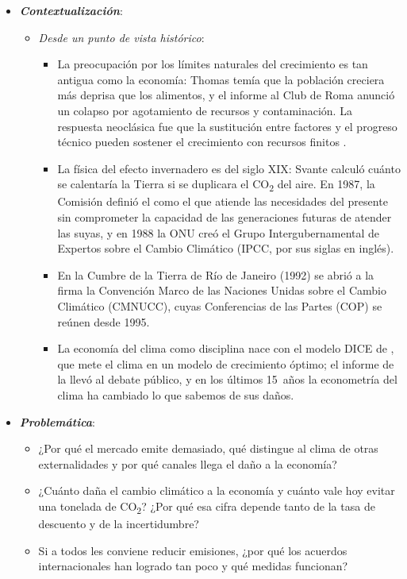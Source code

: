 \documentclass[11pt]{article}
\begin{document}
\begin{itemize}
\item \textbf{\emph{Contextualización}}:
  \begin{itemize}
  \item \emph{Desde un punto de vista histórico}:
  \begin{itemize}
  \item La preocupación por los límites naturales del crecimiento es tan antigua como la economía: Thomas \textcite{Malthus1798Essay} temía que la población creciera más deprisa que los alimentos, y el informe al Club de Roma\nocite{Meadows1972Limits} anunció un colapso por agotamiento de recursos y contaminación. La respuesta neoclásica\nocite{Solow1974Intergenerational,Stiglitz1974Growth} fue que la sustitución entre factores y el progreso técnico pueden sostener el crecimiento con recursos finitos .
  \item La física del efecto invernadero es del siglo XIX: Svante \textcite{Arrhenius1896Influence} calculó cuánto se calentaría la Tierra si se duplicara el CO\textsubscript{2} del aire. En 1987, la Comisión  definió el  como el que atiende las necesidades del presente sin comprometer la capacidad de las generaciones futuras de atender las suyas\nocite{WCED1987Our}, y en 1988 la ONU creó el Grupo Intergubernamental de Expertos sobre el Cambio Climático (IPCC, por sus siglas en inglés).
  \item En la Cumbre de la Tierra de Río de Janeiro (1992) se abrió a la firma la Convención Marco de las Naciones Unidas sobre el Cambio Climático (CMNUCC), cuyas Conferencias de las Partes (COP) se reúnen desde 1995\nocite{CMNUCC1992Convencion}.
  \item La economía del clima como disciplina nace con el modelo DICE de \textcite{Nordhaus1992Optimal}, que mete el clima en un modelo de crecimiento óptimo; el informe de \textcite{Stern2007Economics} la llevó al debate público, y en los últimos 15~años la econometría del clima\nocite{DellJonesOlken2014Weather} ha cambiado lo que sabemos de sus daños.
  \end{itemize}
  \end{itemize}

\item \textbf{\emph{Problemática}}:
  \begin{itemize}
  \item ¿Por qué el mercado emite demasiado, qué distingue al clima de otras externalidades y por qué canales llega el daño a la economía?
  \item ¿Cuánto daña el cambio climático a la economía y cuánto vale hoy evitar una tonelada de CO\textsubscript{2}? ¿Por qué esa cifra depende tanto de la tasa de descuento y de la incertidumbre?
  \item Si a todos les conviene reducir emisiones, ¿por qué los acuerdos internacionales han logrado tan poco y qué medidas funcionan?
  \end{itemize}


\end{itemize}
\end{document}

